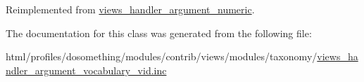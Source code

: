 Reimplemented from \hyperlink{classviews__handler__argument__numeric_a480758dbcde899b5483b091e51e2bf39}{views\_\-handler\_\-argument\_\-numeric}.

The documentation for this class was generated from the following file:\begin{DoxyCompactItemize}
\item 
html/profiles/dosomething/modules/contrib/views/modules/taxonomy/\hyperlink{views__handler__argument__vocabulary__vid_8inc}{views\_\-handler\_\-argument\_\-vocabulary\_\-vid.inc}\end{DoxyCompactItemize}
